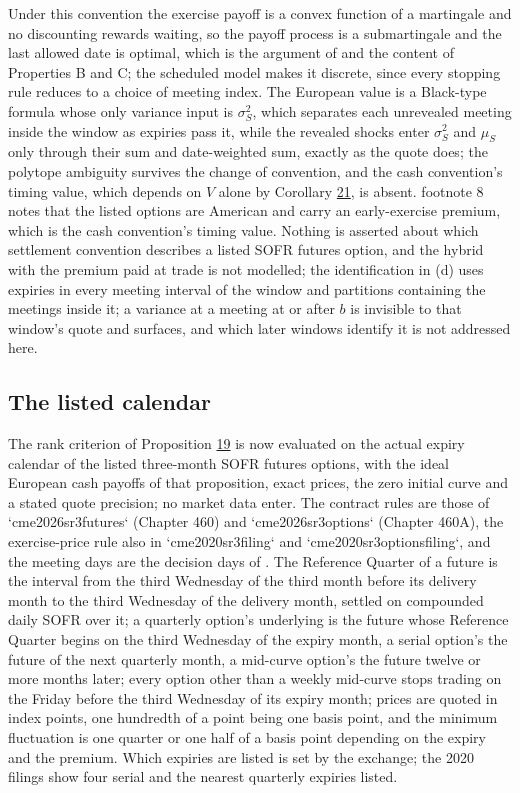 \documentclass[11pt]{article}
\begin{document}
Under this convention the exercise payoff is a convex function of a martingale and no discounting rewards waiting, so the payoff process is a submartingale and the last allowed date is optimal, which is the argument of \cite{chen1993pricing} and the content of \cite{lieu1990option} Properties B and C; the scheduled model makes it discrete, since every stopping rule reduces to a choice of meeting index. The European value is a Black-type formula whose only variance input is \(\sigma_S^2\), which separates each unrevealed meeting inside the window as expiries pass it, while the revealed shocks enter \(\sigma_S^2\) and \(\mu_S\) only through their sum and date-weighted sum, exactly as the quote does; the polytope ambiguity survives the change of convention, and the cash convention's timing value, which depends on \(V\) alone by Corollary \hyperref[res:Corollary-21]{21}, is absent. \cite{skov2021dynamic} footnote 8 notes that the listed options are American and carry an early-exercise premium, which is the cash convention's timing value. Nothing is asserted about which settlement convention describes a listed SOFR futures option, and the hybrid with the premium paid at trade is not modelled; the identification in (d) uses expiries in every meeting interval of the window and partitions containing the meetings inside it; a variance at a meeting at or after \(b\) is invisible to that window's quote and surfaces, and which later windows identify it is not addressed here.

\subsection{The listed calendar}\label{sec:3.21}

The rank criterion of Proposition \hyperref[res:Proposition-19]{19} is now evaluated on the actual expiry calendar of the listed three-month SOFR futures options, with the ideal European cash payoffs of that proposition, exact prices, the zero initial curve and a stated quote precision; no market data enter. The contract rules are those of `cme2026sr3futures` (Chapter 460) and `cme2026sr3options` (Chapter 460A), the exercise-price rule also in `cme2020sr3filing` and `cme2020sr3optionsfiling`, and the meeting days are the decision days of \cite{fomc2026calendar}. The Reference Quarter of a future is the interval from the third Wednesday of the third month before its delivery month to the third Wednesday of the delivery month, settled on compounded daily SOFR over it; a quarterly option's underlying is the future whose Reference Quarter begins on the third Wednesday of the expiry month, a serial option's the future of the next quarterly month, a mid-curve option's the future twelve or more months later; every option other than a weekly mid-curve stops trading on the Friday before the third Wednesday of its expiry month; prices are quoted in index points, one hundredth of a point being one basis point, and the minimum fluctuation is one quarter or one half of a basis point depending on the expiry and the premium. Which expiries are listed is set by the exchange; the 2020 filings show four serial and the nearest quarterly expiries listed.
\end{document}
